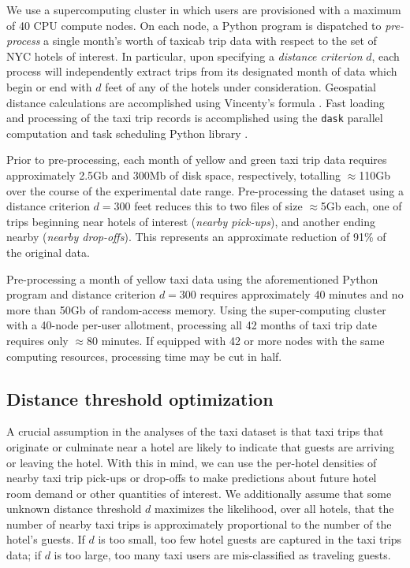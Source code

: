 \documentclass[useAMS, usenatbib]{biom}
\begin{document}
We use a supercomputing cluster in which users are provisioned with a maximum of 40 CPU compute nodes. On each node, a Python program is dispatched to \textit{pre-process} a single month's worth of taxicab trip data with respect to the set of NYC hotels of interest. In particular, upon specifying a \textit{distance criterion} $d$, each process will independently extract trips from its designated month of data which begin or end with $d$ feet of any of the hotels under consideration. Geospatial distance calculations are accomplished using Vincenty's formula \citep{bessel_calculation_2010}. Fast loading and processing of the taxi trip records is accomplished using the \texttt{dask} parallel computation and task scheduling Python library \citep{dask}.

Prior to pre-processing, each month of yellow and green taxi trip data requires approximately 2.5Gb and 300Mb of disk space, respectively, totalling $\approx$110Gb over the course of the experimental date range. Pre-processing the dataset using a distance criterion $d = 300$ feet reduces this to two files of size $\approx$5Gb each, one of trips beginning near hotels of interest (\textit{nearby pick-ups}), and another ending nearby (\textit{nearby drop-offs}). This represents an approximate reduction of 91\% of the original data.

Pre-processing a month of yellow taxi data using the aforementioned Python program and distance criterion $d = 300$ requires approximately 40 minutes and no more than 50Gb of random-access memory. Using the super-computing cluster with a 40-node per-user allotment, processing all 42 months of taxi trip date requires only $\approx$80 minutes. If equipped with 42 or more nodes with the same computing resources, processing time may be cut in half.

\subsection{Distance threshold optimization}
\label{ss:distance_opt}

A crucial assumption in the analyses of the taxi dataset is that taxi trips that originate or culminate near a hotel are likely to indicate that guests are arriving or leaving the hotel. With this in mind, we can use the per-hotel densities of nearby taxi trip pick-ups or drop-offs to make predictions about future hotel room demand or other quantities of interest. We additionally assume that some unknown distance threshold $d$ maximizes the likelihood, over all hotels, that the number of nearby taxi trips is approximately proportional to the number of the hotel's guests. If $d$ is too small, too few hotel guests are captured in the taxi trips data; if $d$ is too large, too many taxi users are mis-classified as traveling guests.
\end{document}
